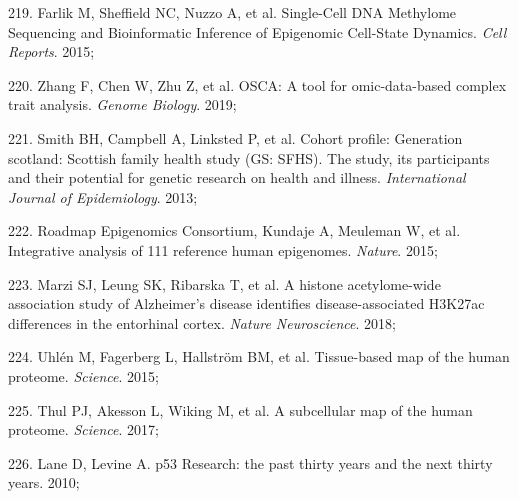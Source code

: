 \documentclass[11pt,oneside]{bristolthesis}
\newenvironment{cslreferences}%
  {}%
  {\par}
\begin{document}
\begin{cslreferences}
\leavevmode\hypertarget{ref-Farlik2015}{}%
219. Farlik M, Sheffield NC, Nuzzo A, et al. Single-Cell DNA Methylome Sequencing and Bioinformatic Inference of Epigenomic Cell-State Dynamics. \emph{Cell Reports}. 2015;

\leavevmode\hypertarget{ref-Zhang2019}{}%
220. Zhang F, Chen W, Zhu Z, et al. OSCA: A tool for omic-data-based complex trait analysis. \emph{Genome Biology}. 2019;

\leavevmode\hypertarget{ref-Smith2013}{}%
221. Smith BH, Campbell A, Linksted P, et al. Cohort profile: Generation scotland: Scottish family health study (GS: SFHS). The study, its participants and their potential for genetic research on health and illness. \emph{International Journal of Epidemiology}. 2013;

\leavevmode\hypertarget{ref-RoadmapEpigenomicsConsortium2015}{}%
222. Roadmap Epigenomics Consortium, Kundaje A, Meuleman W, et al. Integrative analysis of 111 reference human epigenomes. \emph{Nature}. 2015;

\leavevmode\hypertarget{ref-Marzi2018}{}%
223. Marzi SJ, Leung SK, Ribarska T, et al. A histone acetylome-wide association study of Alzheimer's disease identifies disease-associated H3K27ac differences in the entorhinal cortex. \emph{Nature Neuroscience}. 2018;

\leavevmode\hypertarget{ref-Uhlen2015}{}%
224. Uhlén M, Fagerberg L, Hallström BM, et al. Tissue-based map of the human proteome. \emph{Science}. 2015;

\leavevmode\hypertarget{ref-Thul2017}{}%
225. Thul PJ, Akesson L, Wiking M, et al. A subcellular map of the human proteome. \emph{Science}. 2017;

\leavevmode\hypertarget{ref-Lane2010}{}%
226. Lane D, Levine A. p53 Research: the past thirty years and the next thirty years. 2010;
\end{cslreferences}
\end{document}

